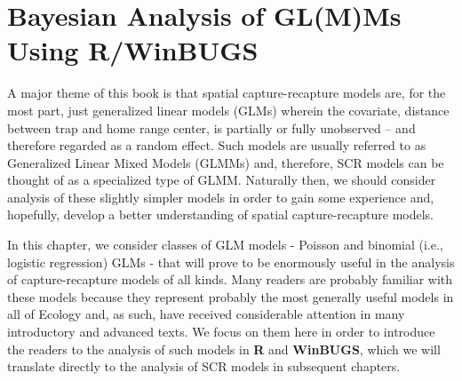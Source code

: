 \chapter{
Bayesian Analysis of GL(M)Ms Using R/WinBUGS
}
\label{chapt.glms}

\vspace{.3in}


A major theme of this book is that spatial capture-recapture models
are, for the most part, just generalized linear models (GLMs) wherein
the covariate, distance between trap and home range center, is
partially or fully unobserved  -- and therefore regarded as
a random effect. Such models
are usually referred to as Generalized Linear Mixed Models (GLMMs)
and, therefore, SCR models can be thought of as a specialized type of
GLMM. Naturally then, we should consider analysis of these slightly
simpler models in order to gain some experience and, hopefully,
develop a better understanding of spatial capture-recapture models.

In this chapter, we consider classes of GLM models - Poisson and
binomial (i.e., logistic regression) GLMs - that will prove to be
enormously useful in the analysis of capture-recapture models of all
kinds. Many readers are probably familiar with these models because
they represent probably
the most generally useful models in all of Ecology and, as
such, have received considerable attention in many introductory and
advanced texts. We focus on them here in order to introduce the
readers to the analysis of such models in {\bf R} and {\bf WinBUGS},
which we will
translate directly to the analysis of SCR models in subsequent
chapters.


